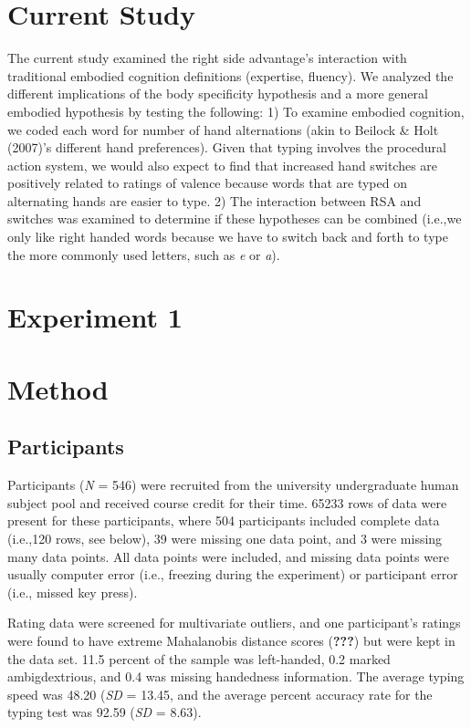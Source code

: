 \documentclass[english,man]{apa6}
\theoremstyle{definition}
\theoremstyle{definition}
\theoremstyle{definition}
\theoremstyle{remark}
\begin{document}
\section{Current Study}\label{current-study}

The current study examined the right side advantage's interaction with
traditional embodied cognition definitions (expertise, fluency). We
analyzed the different implications of the body specificity hypothesis
and a more general embodied hypothesis by testing the following: 1) To
examine embodied cognition, we coded each word for number of hand
alternations (akin to Beilock \& Holt (2007)'s different hand
preferences). Given that typing involves the procedural action system,
we would also expect to find that increased hand switches are positively
related to ratings of valence because words that are typed on
alternating hands are easier to type. 2) The interaction between RSA and
switches was examined to determine if these hypotheses can be combined
(i.e.,we only like right handed words because we have to switch back and
forth to type the more commonly used letters, such as \emph{e} or
\emph{a}).

\section{Experiment 1}\label{experiment-1}

\section{Method}\label{method}

\subsection{Participants}\label{participants}

Participants (\emph{N} = 546) were recruited from the university
undergraduate human subject pool and received course credit for their
time. 65233 rows of data were present for these participants, where 504
participants included complete data (i.e.,120 rows, see below), 39 were
missing one data point, and 3 were missing many data points. All data
points were included, and missing data points were usually computer
error (i.e., freezing during the experiment) or participant error (i.e.,
missed key press).

Rating data were screened for multivariate outliers, and one
participant's ratings were found to have extreme Mahalanobis distance
scores ({\textbf{???}}) but were kept in the data set. 11.5 percent of
the sample was left-handed, 0.2 marked ambigdextrious, and 0.4 was
missing handedness information. The average typing speed was 48.20
(\emph{SD} = 13.45, and the average percent accuracy rate for the typing
test was 92.59 (\emph{SD} = 8.63).
\end{document}
